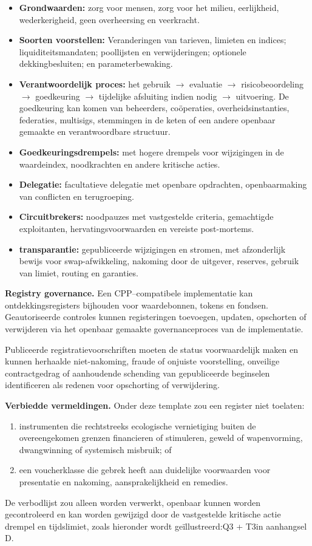\documentclass[11pt]{article}
\begin{document}
\begin{itemize}[leftmargin=*]
\item \textbf{Grondwaarden:} zorg voor mensen, zorg voor het milieu, eerlijkheid, wederkerigheid, geen overheersing en veerkracht.
\item \textbf{Soorten voorstellen:} Veranderingen van tarieven, limieten en indices; liquiditeitsmandaten; poollijsten en verwijderingen; optionele dekkingbesluiten; en parameterbewaking.
\item \textbf{Verantwoordelijk proces:} het gebruik $\to$ evaluatie $\to$ risicobeoordeling $\to$ goedkeuring $\to$ tijdelijke afsluiting indien nodig $\to$ uitvoering. De goedkeuring kan komen van beheerders, coöperaties, overheidsinstanties, federaties, multisigs, stemmingen in de keten of een andere openbaar gemaakte en verantwoordbare structuur.
\item \textbf{Goedkeuringsdrempels:} met hogere drempels voor wijzigingen in de waardeindex, noodkrachten en andere kritische acties.
\item \textbf{Delegatie:} facultatieve delegatie met openbare opdrachten, openbaarmaking van conflicten en terugroeping.
\item \textbf{Circuitbrekers:} noodpauzes met vastgestelde criteria, gemachtigde exploitanten, hervatingsvoorwaarden en vereiste post-mortems.
\item \textbf{transparantie:} gepubliceerde wijzigingen en stromen, met afzonderlijk bewijs voor swap-afwikkeling, nakoming door de uitgever, reserves, gebruik van limiet, routing en garanties.
\end{itemize}
\textbf{Registry governance.} Een CPP--compatibele implementatie kan ontdekkingsregisters bijhouden voor waardebonnen, tokens en fondsen. Geautoriseerde controles kunnen registeringen toevoegen, updaten, opschorten of verwijderen via het openbaar gemaakte governanceproces van de implementatie.

Publiceerde registratievoorschriften moeten de status voorwaardelijk maken en kunnen herhaalde niet-nakoming, fraude of onjuiste voorstelling, onveilige contractgedrag of aanhoudende schending van gepubliceerde beginselen identificeren als redenen voor opschorting of verwijdering.

\textbf{Verbiedde vermeldingen.} Onder deze template zou een register niet toelaten:

\begin{enumerate}[leftmargin=*]
\item instrumenten die rechtstreeks ecologische vernietiging buiten de overeengekomen grenzen financieren of stimuleren, geweld of wapenvorming, dwangwinning of systemisch misbruik; of
\item een voucherklasse die gebrek heeft aan duidelijke voorwaarden voor presentatie en nakoming, aansprakelijkheid en remedies.
\end{enumerate}
De verbodlijst zou alleen worden verwerkt, openbaar kunnen worden gecontroleerd en kan worden gewijzigd door de vastgestelde kritische actie drempel en tijdslimiet, zoals hieronder wordt geïllustreerd:Q3 + T3in aanhangsel D.
\end{document}
